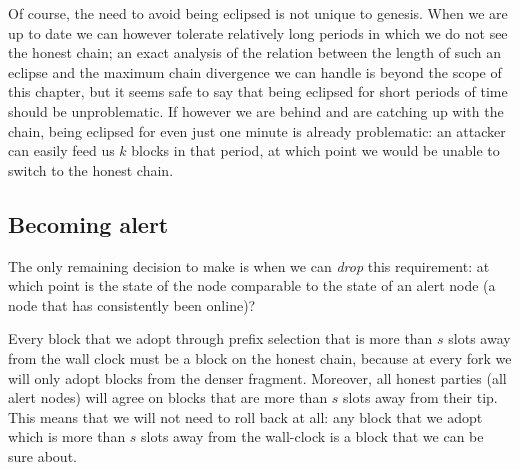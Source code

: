 Of course, the need to avoid being eclipsed is not unique to genesis. When we
are up to date we can however tolerate relatively long periods in which we do
not see the honest chain; an exact analysis of the relation between the length
of such an eclipse and the maximum chain divergence we can handle is beyond the
scope of this chapter, but it seems safe to say that being eclipsed for short
periods of time should be unproblematic. If however we are behind and are
catching up with the chain, being eclipsed for even just one minute is already
problematic: an attacker can easily feed us $k$ blocks in that period, at which
point we would be unable to switch to the honest chain.

\subsection{Becoming alert}
\label{genesis:becoming-alert}

The only remaining decision to make is when we can \emph{drop} this requirement:
at which point is the state of the node comparable to the state of an alert node
(a node that has consistently been online)?

Every block that we adopt through prefix selection that is more than $s$ slots
away from the wall clock must be a block on the honest chain, because at every
fork we will only adopt blocks from the denser fragment. Moreover, all honest
parties (all alert nodes) will agree on blocks that are more than $s$ slots away
from their tip. This means that we will not need to roll back at all: any block
that we adopt which is more than $s$ slots away from the wall-clock is a block
that we can be sure about.

